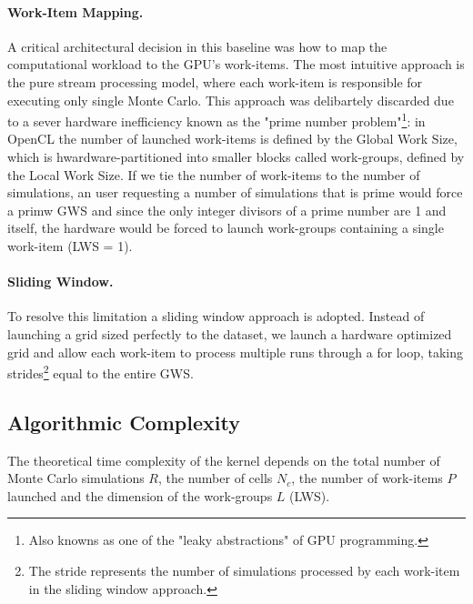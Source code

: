 \paragraph{Work-Item Mapping.}
A critical architectural decision in this baseline was how to map the computational workload to the GPU's work-items. The most intuitive approach is the pure stream processing model, where each work-item is responsible for executing only single Monte Carlo. This approach was delibartely discarded due to a sever hardware inefficiency known as the "prime number problem"\footnote{Also knowns as one of the "leaky abstractions" of GPU programming.}: in OpenCL the number of launched work-items is defined by the Global Work Size, which is hwardware-partitioned into smaller blocks called work-groups, defined by the Local Work Size. If we tie the number of work-items to the number of simulations, an user requesting a number of simulations that is prime would force a primw GWS and since the only integer divisors of a prime number are 1 and itself, the hardware would be forced to launch work-groups containing a single work-item (LWS = 1).

\paragraph{Sliding Window.}
To resolve this limitation a sliding window approach is adopted. Instead of launching a grid sized perfectly to the dataset, we launch a hardware optimized grid and allow each work-item to process multiple runs through a for loop, taking strides\footnote{The stride represents the number of simulations processed by each work-item in the sliding window approach.} equal to the entire GWS.

\subsection{Algorithmic Complexity}\label{subsec:algorithmic_complexity}
The theoretical time complexity of the kernel depends on the total number of Monte Carlo simulations $R$, the number of cells $N_c$, the number of work-items $P$ launched and the dimension of the work-groups $L$ (LWS). 

